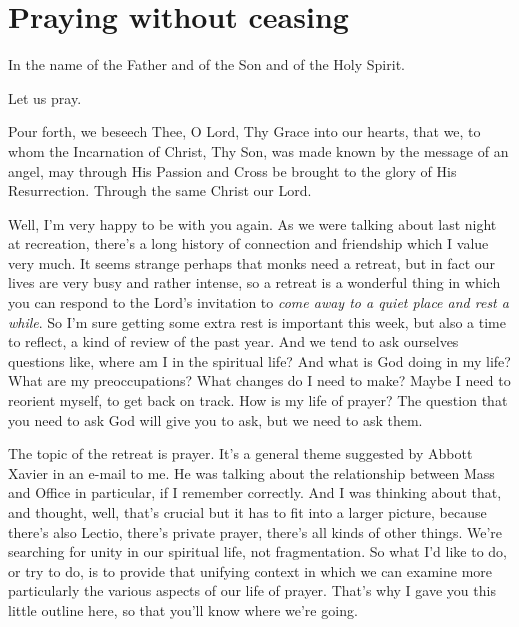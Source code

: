 \chapter{Praying without ceasing}



\begin{itshape}
In the name of the Father and of the Son and of the Holy Spirit.

\smallskip

\noindent Let us pray.

\smallskip

\noindent Pour forth, we beseech Thee, O Lord, Thy Grace into our hearts, that we, to whom the Incarnation of Christ, Thy Son, was made known by the message of an angel, may through His Passion and Cross be brought to the glory of His Resurrection. Through the same Christ our Lord.
\end{itshape}

\smallskip

Well, I'm very happy to be with you again. As we were talking about last night at recreation, there's a long history of connection and friendship which I value very much. It seems strange perhaps that monks need a retreat, but in fact our lives are very busy and rather intense, so a retreat is a wonderful thing in which you can respond to the Lord's invitation to \emph{come away to a quiet place and rest a while}. So I'm sure getting some extra rest is important this week, but also a time to reflect, a kind of review of the past year. And we tend to ask ourselves questions like, where am I in the spiritual life? And what is God doing in my life? What are my preoccupations? What changes do I need to make? Maybe I need to reorient myself, to get back on track. How is my life of prayer? The question that you need to ask God will give you to ask, but we need to ask them.

The topic of the retreat is prayer. It's a general theme suggested by Abbott Xavier in an e-mail to me. He was talking about the relationship between Mass and Office in particular, if I remember correctly. And I was thinking about that, and thought, well, that's crucial but it has to fit into a larger picture, because there's also Lectio, there's private prayer, there's all kinds of other things. We're searching for unity in our spiritual life, not fragmentation. So what I'd like to do, or try to do, is to provide that unifying context in which we can examine more particularly the various aspects of our life of prayer. That's why I gave you this little outline here, so that you'll know where we're going.

